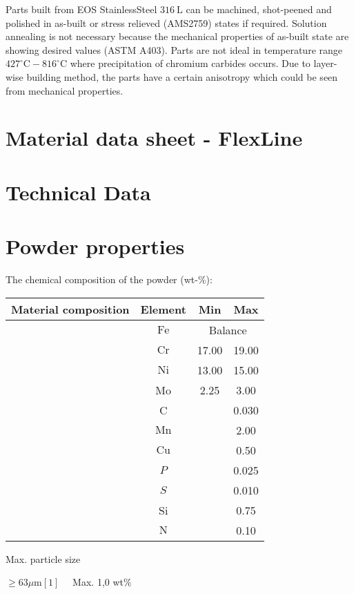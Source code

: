 \documentclass[10pt]{article}
\begin{document}
Parts built from EOS StainlessSteel $316 \mathrm{~L}$ can be machined, shot-peened and polished in as-built or stress relieved (AMS2759) states if required. Solution annealing is not necessary because the mechanical properties of as-built state are showing desired values (ASTM A403). Parts are not ideal in temperature range $427^{\circ} \mathrm{C}-816^{\circ} \mathrm{C}$ where precipitation of chromium carbides occurs. Due to layer-wise building method, the parts have a certain anisotropy which could be seen from mechanical properties.

\section*{Material data sheet - FlexLine}
\section*{Technical Data}
\section*{Powder properties}
The chemical composition of the powder (wt-\%):

\begin{center}
\begin{tabular}{|c|c|c|c|}
\hline
Material composition & Element & Min & Max \\
\hline
 & $\mathrm{Fe}$ & \multicolumn{2}{|c|}{Balance} \\
\hline
 & $\mathrm{Cr}$ & 17.00 & 19.00 \\
\hline
 & $\mathrm{Ni}$ & 13.00 & 15.00 \\
\hline
 & Mo & 2.25 & 3.00 \\
\hline
 & C &  & 0.030 \\
\hline
 & $\mathrm{Mn}$ &  & 2.00 \\
\hline
 & $\mathrm{Cu}$ &  & 0.50 \\
\hline
 & $P$ &  & 0.025 \\
\hline
 & $S$ &  & 0.010 \\
\hline
 & Si &  & 0.75 \\
\hline
 & $\mathrm{N}$ &  & 0.10 \\
\hline
\end{tabular}
\end{center}

Max. particle size

$\geq 63 \mu \mathrm{m}[1] \quad$ Max. 1,0 wt\%
\end{document}

